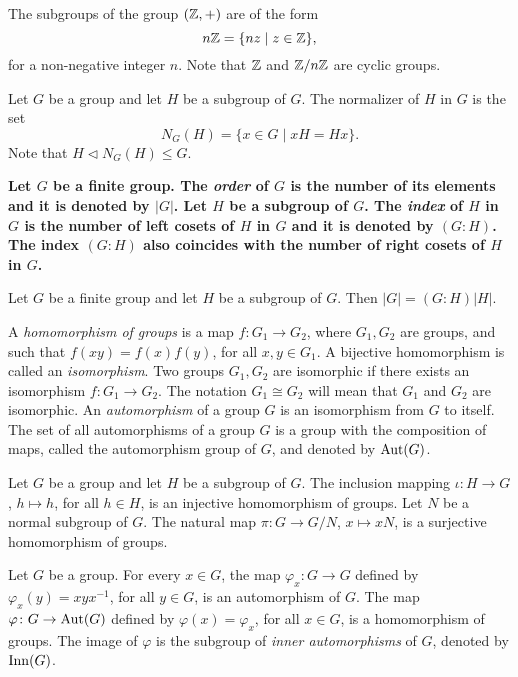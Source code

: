 \begin{example}
	The subgroups of the group $(\mathbb{Z},+)$ are of the form
	$$n\mathbb{Z}=\{ nz\mid z\in\mathbb{Z}\},$$
	for a non-negative integer $n$. Note that $\mathbb{Z}$ and $\mathbb{Z}/n\mathbb{Z}$ are cyclic groups.  
	\end{example} 

\begin{example} Let $G$ be a group and let $H$ be a subgroup of $G$. The normalizer of $H$ in $G$ is the set
	$$N_G(H)=\{ x\in G\mid xH=Hx\}.$$
	Note that $H\lhd N_G(H)\leq G$.
	\end{example}

{\bf Let $G$ be a finite group. The {\em order} of $G$ is the number of its elements and it is denoted by $|G|$. Let $H$ be a subgroup of $G$. The {\em index} of $H$ in $G$ is the number of left cosets of $H$ in $G$ and it is denoted by $(G:H)$. The index $(G:H)$ also coincides with the number of right cosets of $H$ in $G$.

\begin{theorem}
Let $G$ be a finite group and let $H$ be a subgroup of $G$. Then $|G|=(G:H)|H|$.
\end{theorem}
}

A {\em homomorphism of groups} is a map $f\colon G_1\rightarrow G_2$, where $G_1,G_2$ are groups, and such that $f(xy)=f(x)f(y)$, for all $x,y\in G_1$. A bijective homomorphism is called an {\em isomorphism}. Two groups $G_1,G_2$ are isomorphic if there exists an isomorphism $f\colon G_1\rightarrow G_2$. The notation $G_1\cong G_2$ will mean that $G_1$ and $G_2$ are isomorphic. An {\em automorphism} of a group $G$ is an isomorphism from $G$ to itself. The set of all automorphisms of a group $G$ is a group with the composition of maps, called the automorphism group of $G$, and denoted by $\operatorname{Aut}(G)$.

\begin{example} Let $G$ be a group and let $H$ be a subgroup of $G$. The inclusion mapping $\iota\colon H\rightarrow G$, $h\mapsto h$, for all $h\in H$, is an injective homomorphism of groups. Let $N$ be a normal subgroup of $G$. The natural map $\pi\colon G\rightarrow G/N$, $x\mapsto xN$, is a surjective homomorphism of groups.  
	\end{example}

\begin{example}
	Let $G$ be a group. For every $x\in G$, the map $\varphi_x\colon G\rightarrow G$ defined by $\varphi_x(y)=xyx^{-1}$, for all $y\in G$, is an automorphism of $G$. The map $\varphi\colon G\rightarrow \operatorname{Aut}(G)$ defined by $\varphi(x)=\varphi_x$, for all $x\in G$, is a homomorphism of groups. The image of $\varphi$ is the subgroup of {\em inner automorphisms} of $G$, denoted by $\mathrm{Inn}(G)$.
	\end{example}
 
